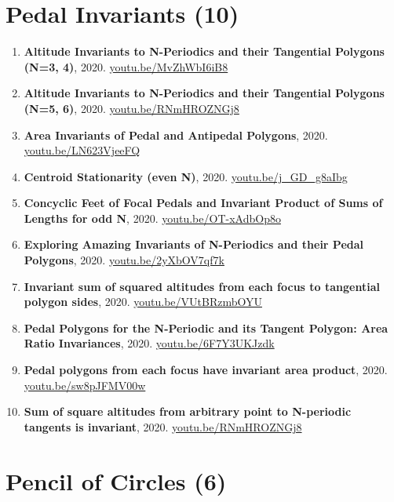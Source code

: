 \documentclass[12pt]{article}
\begin{document}
\section{Pedal Invariants (10)}

\begin{enumerate}[resume]
\item \textbf{Altitude Invariants to N-Periodics and their Tangential Polygons (N=3, 4)}, 2020. \href{https://youtu.be/MvZhWbI6iB8}{\url{youtu.be/MvZhWbI6iB8}}
\item \textbf{Altitude Invariants to N-Periodics and their Tangential Polygons (N=5, 6)}, 2020. \href{https://youtu.be/RNmHROZNGj8}{\url{youtu.be/RNmHROZNGj8}}
\item \textbf{Area Invariants of Pedal and Antipedal Polygons}, 2020. \href{https://youtu.be/LN623VjeeFQ}{\url{youtu.be/LN623VjeeFQ}}
\item \textbf{Centroid Stationarity (even N)}, 2020. \href{https://youtu.be/j_GD_g8aIbg}{\url{youtu.be/j\_GD\_g8aIbg}}
\item \textbf{Concyclic Feet of Focal Pedals and Invariant Product of Sums of Lengths for odd N}, 2020. \href{https://youtu.be/OT-xAdbOp8o}{\url{youtu.be/OT-xAdbOp8o}}
\item \textbf{Exploring Amazing Invariants of N-Periodics and their Pedal Polygons}, 2020. \href{https://youtu.be/2yXbOV7qf7k}{\url{youtu.be/2yXbOV7qf7k}}
\item \textbf{Invariant sum of squared altitudes from each focus to tangential polygon sides}, 2020. \href{https://youtu.be/VUtBRzmbOYU}{\url{youtu.be/VUtBRzmbOYU}}
\item \textbf{Pedal Polygons for the N-Periodic and its Tangent Polygon: Area Ratio Invariances}, 2020. \href{https://youtu.be/6F7Y3UKJzdk}{\url{youtu.be/6F7Y3UKJzdk}}
\item \textbf{Pedal polygons from each focus have invariant area product}, 2020. \href{https://youtu.be/sw8pJFMV00w}{\url{youtu.be/sw8pJFMV00w}}
\item \textbf{Sum of square altitudes from arbitrary point to N-periodic tangents is invariant}, 2020. \href{https://youtu.be/RNmHROZNGj8}{\url{youtu.be/RNmHROZNGj8}}
\end{enumerate}

\section{Pencil of Circles (6)}
\end{document}
